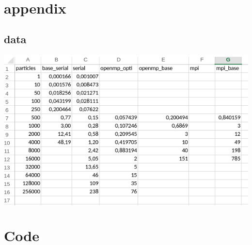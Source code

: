 \documentclass[a4paper,10pt,titlepage]{report}
\begin{document}
\section{appendix}
\subsection{data}
\includegraphics[scale=0.7]{alldata}

\section{Code}

%

%
\end{document}

